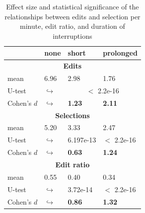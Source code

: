 \documentclass[times]{smrauth}
\begin{document}



\begin{table}[ht!]
\tiny
\renewcommand{\arraystretch}{1.3}
\caption{Effect size and statistical significance of the relationships between edits and selection per minute, edit ratio, and duration of interruptions} %
\label{tbl:p_value2}
\centering
\begin{tabular}{l | p{0.7cm} | p{1.9cm} | p{1.9cm} } 
   & none & short &  prolonged  \\  
  \hline
  \multicolumn{4}{c}{\textbf{Edits}} \\
  \hline
  mean & 6.96 &	2.98 & 1.76 \\ 
   \cline{3-4} 
  U-test & $\hookrightarrow$ & \multicolumn{2}{c}{$<$ 2.2e-16}  \\

  \cline{3-4} 
  Cohen's $d$ & $\hookrightarrow$	& \textbf{1.23} & \textbf{2.11}   \\
  \hline
  
  
  \multicolumn{4}{c}{\textbf{Selections}} \\
  \hline 
  mean & 5.20 &	3.33 & 2.47 \\ 
   \cline{3-4} 
  U-test & $\hookrightarrow$ & 6.197e-13 & $<$ 2.2e-16 \\
  
  \cline{3-4} 
  Cohen's $d$ & $\hookrightarrow$	& \textbf{0.63} & \textbf{1.24}  \\  
  \hline
  \multicolumn{4}{c}{\textbf{Edit ratio}} \\
  \hline 
  mean & 0.55 & 0.40 & 0.34\\ 
   \cline{3-4} 
  U-test & $\hookrightarrow$ & 3.72e-14 & $<$ 2.2e-16  \\
  \cline{3-4} 
  Cohen's $d$ & $\hookrightarrow$ & \textbf{0.86} & \textbf{1.32}\\
\hline

\end{tabular}
\end{table}
\end{document}
